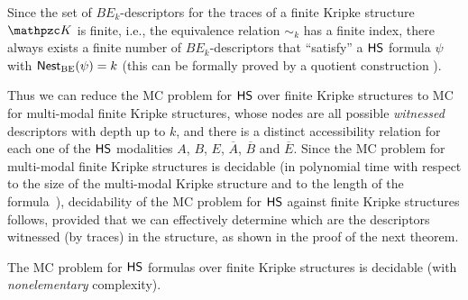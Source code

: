 Since the set of $BE_k$-descriptors for the traces of a finite Kripke structure $\Ku$ is finite, i.e., the equivalence relation $\sim_k$ has a finite index, there always exists a finite number of $BE_k$-descriptors that ``satisfy'' a $\text{\sffamily HS}$ formula $\psi$ with $\operatorname{\mathsf{Nest}_{BE}}(\psi)= k$ (this can be formally proved by a quotient construction \cite{MMMPP15}). 

Thus we can reduce the MC problem for $\text{\sffamily HS}$ over finite Kripke structures to MC for multi-modal finite Kripke structures, whose nodes are all possible \emph{witnessed} descriptors with depth up to $k$, and there is a distinct accessibility relation for each one of the $\text{\sffamily HS}$ modalities $A$, $B$, $E$, $\overline{A}$, $\overline{B}$ and $\overline{E}$.
Since the MC problem for multi-modal finite Kripke structures is decidable (in polynomial time with respect to the size of the multi-modal Kripke structure and to the length of the formula~\cite{Gabbay87,Lan06}),
decidability of the MC problem for $\text{\sffamily HS}$ against finite Kripke structures follows, provided that we can effectively determine which are the descriptors witnessed (by traces) in the structure, as shown in the proof of the next theorem.
\begin{theorem} 
The MC problem for $\text{\sffamily HS}$ formulas over finite Kripke structures is decidable (with \emph{nonelementary} complexity).
\end{theorem}
